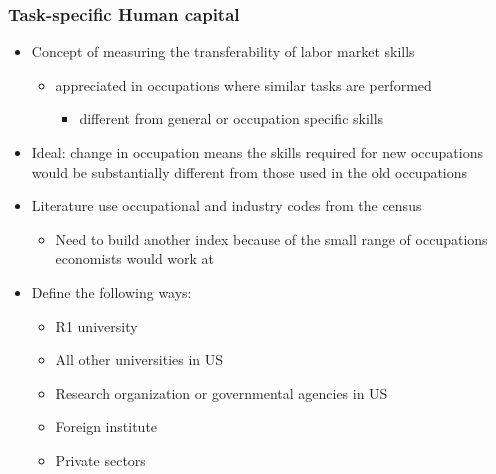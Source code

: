 \documentclass[11pt]{beamer}
\begin{document}
\begin{frame}
	\frametitle{Task-specific Human capital}
	\begin{itemize}
		\item Concept of measuring the transferability of labor market skills
		\begin{itemize}
		\item appreciated in occupations where similar tasks are performed
		\begin{itemize}
			\item different from general or occupation specific skills
		\end{itemize}
		
		\end{itemize}
	\item Ideal: change in occupation means the skills required for new occupations would be substantially different from those used in the old occupations
		\vspace{1 mm}
	\item Literature use occupational and industry codes from the census
	\begin{itemize}
		\item Need to build another index because of the small range of occupations economists would work at
	\end{itemize}
		\vspace{1 mm}
	\item Define the following ways:
	\begin{itemize}
		\item R1 university
		\item All other universities in US
		\item Research organization or governmental agencies in US
		\item Foreign institute
		\item Private sectors
	\end{itemize}
	\end{itemize}
\end{frame}
\end{document}

